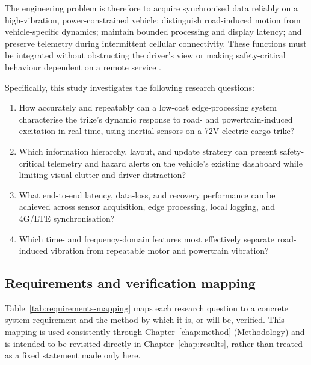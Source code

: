 The engineering problem is therefore to acquire synchronised data reliably on a high-vibration, power-constrained vehicle; distinguish road-induced motion from vehicle-specific dynamics; maintain bounded processing and display latency; and preserve telemetry during intermittent cellular connectivity. These functions must be integrated without obstructing the driver's view or making safety-critical behaviour dependent on a remote service \cite{winberg2026}.

Specifically, this study investigates the following research questions:

\begin{enumerate}
\item How accurately and repeatably can a low-cost edge-processing system characterise the trike's dynamic response to road- and powertrain-induced excitation in real time, using inertial sensors on a 72V electric cargo trike?
\item Which information hierarchy, layout, and update strategy can present safety-critical telemetry and hazard alerts on the vehicle's existing dashboard while limiting visual clutter and driver distraction?
\item What end-to-end latency, data-loss, and recovery performance can be achieved across sensor acquisition, edge processing, local logging, and 4G/LTE synchronisation?
\item Which time- and frequency-domain features most effectively separate road-induced vibration from repeatable motor and powertrain vibration?
\end{enumerate}

\subsection{Requirements and verification mapping}
\label{sec:requirements-mapping}

Table~\ref{tab:requirements-mapping} maps each research question to a concrete system requirement and the method by which it is, or will be, verified. This mapping is used consistently through Chapter~\ref{chap:method} (Methodology) and is intended to be revisited directly in Chapter~\ref{chap:results}, rather than treated as a fixed statement made only here.

